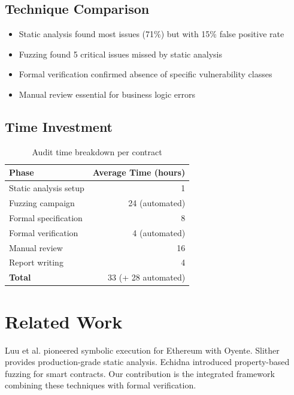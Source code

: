 \documentclass[11pt,a4paper]{article}
\theoremstyle{definition}
\begin{document}
\subsection{Technique Comparison}

\begin{itemize}
    \item Static analysis found most issues (71\%) but with 15\% false positive rate
    \item Fuzzing found 5 critical issues missed by static analysis
    \item Formal verification confirmed absence of specific vulnerability classes
    \item Manual review essential for business logic errors
\end{itemize}

\subsection{Time Investment}

\begin{table}[h]
\centering
\begin{tabular}{lr}
\toprule
\textbf{Phase} & \textbf{Average Time (hours)} \\
\midrule
Static analysis setup & 1 \\
Fuzzing campaign & 24 (automated) \\
Formal specification & 8 \\
Formal verification & 4 (automated) \\
Manual review & 16 \\
Report writing & 4 \\
\midrule
\textbf{Total} & 33 (+ 28 automated) \\
\bottomrule
\end{tabular}
\caption{Audit time breakdown per contract}
\end{table}

\section{Related Work}

Luu et al. \cite{oyente} pioneered symbolic execution for Ethereum with Oyente. Slither \cite{slither} provides production-grade static analysis. Echidna \cite{echidna} introduced property-based fuzzing for smart contracts. Our contribution is the integrated framework combining these techniques with formal verification.
\end{document}
